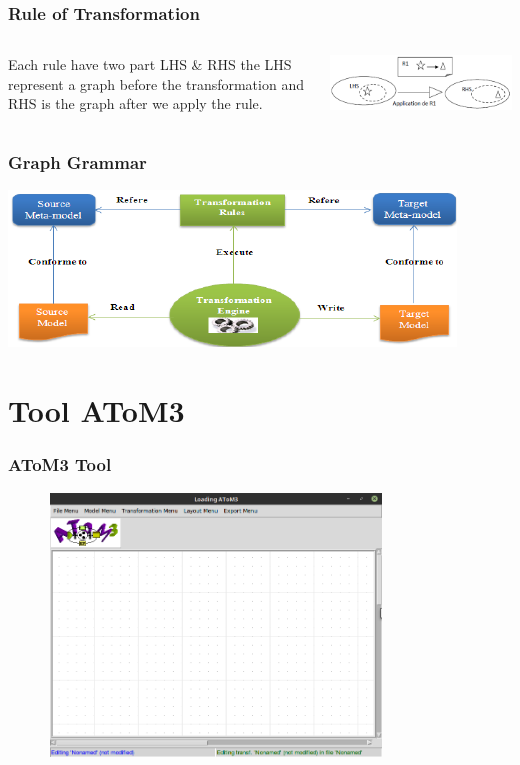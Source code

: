 \documentclass[12pt]{beamer}
\begin{document}
\begin{frame}
\frametitle{Rule of Transformation} 

\begin{columns}
	
	 \begin{center}
	Each rule have two part LHS \& RHS the LHS represent a graph before the transformation and RHS is the graph after we apply the rule.
	\end{center}
	\includegraphics[scale=1.1]{r.png}
	
\end{columns}

\end{frame}
\begin{frame}
\frametitle{Graph Grammar} 
	 \begin{center}	
	\includegraphics[scale=0.7]{cycle.png}
	\end{center}
\end{frame}

\section{Tool AToM3}

\begin{frame}
\frametitle{AToM3 Tool} 
	 \begin{center}	
	\includegraphics[width=11cm,height=7cm]{atom3.png}
	\end{center}
\end{frame}
\end{document}

